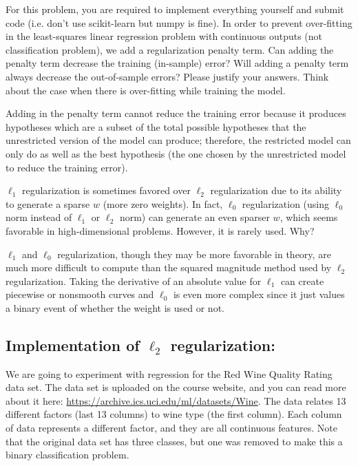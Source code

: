 For this problem, you are required to implement everything yourself and submit code (i.e. don't use scikit-learn but numpy is fine).
\indent\problem[4] 
In order to prevent over-fitting in the least-squares linear regression problem with continuous outputs (not classification problem), we add a regularization penalty term.
Can adding the penalty term decrease the training (in-sample) error?
Will adding a penalty term always decrease the out-of-sample errors?
Please justify your answers. Think about the case when there is over-fitting while training the model.

\begin{solution}
  Adding in the penalty term cannot reduce the training error because it produces hypotheses which are a subset of the total possible hypotheses that the unrestricted version of the model can produce; therefore, the restricted model can only do as well as the best hypothesis (the one chosen by the unrestricted model to reduce the training error).
\end{solution}

\problem[4]
$\ell_1$ regularization is sometimes favored over $\ell_2$ regularization due to its ability to generate a sparse $w$ (more zero weights).
In fact, $\ell_0$ regularization (using $\ell_0$ norm instead of $\ell_1$ or $\ell_2$ norm) can generate an even sparser $w$, which seems favorable in high-dimensional problems.
However, it is rarely used.  Why?

\begin{solution}
  $\ell_1$ and $\ell_0$ regularization, though they may be more favorable in theory, are much more difficult to compute than the squared magnitude method used by $\ell_2$ regularization. Taking the derivative of an absolute value for $\ell_1$ can create piecewise or nonsmooth curves and $\ell_0$ is even more complex since it just values a binary event of whether the weight is used or not. 
\end{solution}

\subsection{Implementation of \texorpdfstring{$\ell_2$}{L2} regularization:}

We are going to experiment with regression for the Red Wine Quality Rating data set. The data set is uploaded on the course website, and you can read more about it here: \url{https://archive.ics.uci.edu/ml/datasets/Wine}. The data relates 13 different factors (last 13 columns) to wine type (the first column). Each column of data represents a different factor, and they are all continuous features. Note that the original data set has three classes, but one was removed to make this a binary classification problem.

